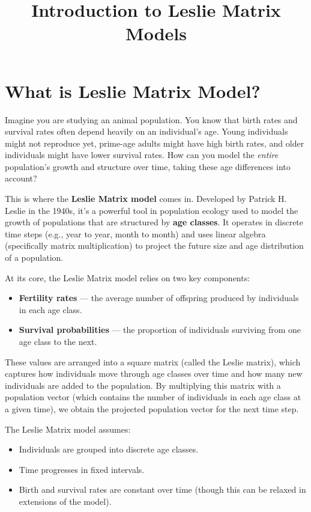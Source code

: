 \documentclass{article}
\title{Introduction to Leslie Matrix Models}
\begin{document}
\maketitle

\section{What is Leslie Matrix Model?}

Imagine you are studying an animal population. You know that birth rates and survival rates often depend heavily on an individual's age. Young individuals might not reproduce yet, prime-age adults might have high birth rates, and older individuals might have lower survival rates. How can you model the \emph{entire} population's growth and structure over time, taking these age differences into account?

This is where the \textbf{Leslie Matrix model} comes in. Developed by Patrick H. Leslie in the 1940s, it's a powerful tool in population ecology used to model the growth of populations that are structured by \textbf{age classes}. It operates in discrete time steps (e.g., year to year, month to month) and uses linear algebra (specifically matrix multiplication) to project the future size and age distribution of a population.

At its core, the Leslie Matrix model relies on two key components:
\begin{itemize}
    \item \textbf{Fertility rates} --- the average number of offspring produced by individuals in each age class.
    \item \textbf{Survival probabilities} --- the proportion of individuals surviving from one age class to the next.
\end{itemize}

These values are arranged into a square matrix (called the Leslie matrix), which captures how individuals move through age classes over time and how many new individuals are added to the population. By multiplying this matrix with a population vector (which contains the number of individuals in each age class at a given time), we obtain the projected population vector for the next time step.

The Leslie Matrix model assumes:
\begin{itemize}
    \item Individuals are grouped into discrete age classes.
    \item Time progresses in fixed intervals.
    \item Birth and survival rates are constant over time (though this can be relaxed in extensions of the model).
\end{itemize}
\end{document}
